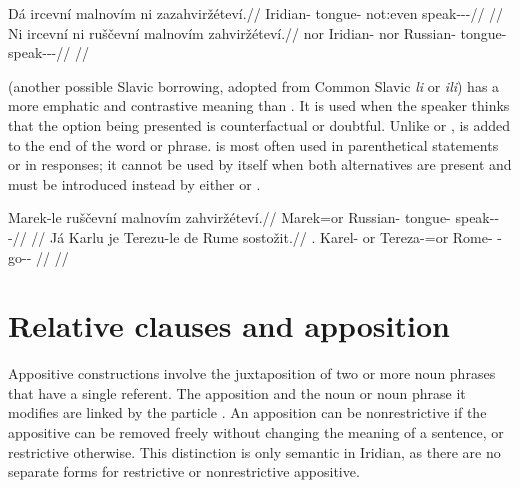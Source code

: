 \pex\a\begingl
\gla Dá ircevní malnovím ni zazahviržéteví.//
\glb \First{}\Sg{}\Str{} Iridian-\Att{} tongue-\Ins{} not:even speak-\Av{}-\Pot{}-\Cont{}//
\glft {}//
\endgl
\a\begingl
\gla Ni ircevní ni ruščevní malnovím zahviržéteví.//
\glb nor Iridian-\Att{} nor Russian-\Att{} tongue-\Ins{} speak-\Av{}-\Pot{}-\Cont{}//
\glft {}//
\endgl
\a{}
\xe

 (another possible Slavic borrowing, adopted from Common Slavic \emph{li} or \emph{ili}) has a more
emphatic and contrastive meaning than . It is used when the speaker
thinks that the option being presented is counterfactual or doubtful. Unlike
 or ,  is added to the end of the word or phrase.
 is most often used in parenthetical statements or in responses; it
cannot be used by itself when both alternatives are present and must be
introduced instead by either  or .

\pex\a\begingl
\gla Marek-le ruščevní malnovím zahviržéteví.//
\glb Marek=or Russian-\Att{} tongue-\Ins{} speak-\Av{}-\Pot{}-\Cont{}//
\glft {}//
\endgl
\a
\begingl
\gla Já Karlu je Terezu-le de Rume sostožit.//
\glb \Second{}\Sg{}.\Str{} Karel-\Ins{} or Tereza-\Ins{}=or \Lat{} Rome-\Acc{} \Rec{}-go-\Av{}-\Sup{}  //
\glft {}//
\endgl\xe

\section{Relative clauses and apposition}
\label{sec:relative-clauses}

Appositive constructions involve the juxtaposition of two or
more noun phrases that have a single referent. The apposition and the noun or
noun phrase it modifies are linked by the particle . An apposition can
be nonrestrictive if the appositive can be removed freely without changing the
meaning of a sentence, or restrictive otherwise. This distinction is only
semantic in Iridian, as there are no separate forms for restrictive or
nonrestrictive appositive.

